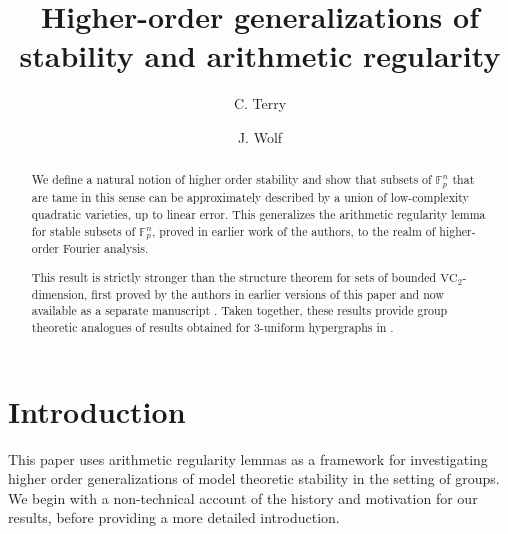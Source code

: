 \documentclass[12pt,oneside,british,a4wide]{amsart}
\numberwithin{equation}{section}
\theoremstyle{definition}
\def\F{\mathbb{F}}
\def\VC{\mathrm{VC}}
\begin{document}
\title[Higher-order generalizations of stability and arithmetic regularity]{Higher-order generalizations of stability and arithmetic regularity}

\author{C. Terry}

\author{J. Wolf}

\address{Department of Mathematics, Statistics, and Computer Science, University of Illinois Chicago, Chicago IL 60607, USA}


\address{Department of Pure Mathematics and Mathematical Statistics, Centre for Mathematical Sciences, Wilberforce Road, Cambridge CB3 0WB, UK}


\date{}

\begin{abstract}We define a natural notion of higher order stability and show that subsets of $\F_p^n$ that are tame in this sense can be approximately described by a union of low-complexity quadratic varieties, up to linear error. This generalizes the arithmetic regularity lemma for stable subsets of $\F_p^n$, proved in earlier work of the authors, to the realm of higher-order Fourier analysis.  

This result is strictly stronger than the structure theorem for sets of bounded $\VC_2$-dimension, first proved by the authors in earlier versions of this paper \cite{Terry.2021av2} and now available as a separate manuscript \cite{Terry.2021d}. Taken together, these results provide group theoretic analogues of results obtained for 3-uniform hypergraphs in \cite{Terry.2021b}.
\end{abstract}


 

\maketitle

\tableofcontents

\section{Introduction}

This paper uses arithmetic regularity lemmas as a framework for investigating higher order generalizations of model theoretic stability in the setting of groups.  We begin with a non-technical account of the history and motivation for our results, before providing a more detailed introduction.
\end{document}
